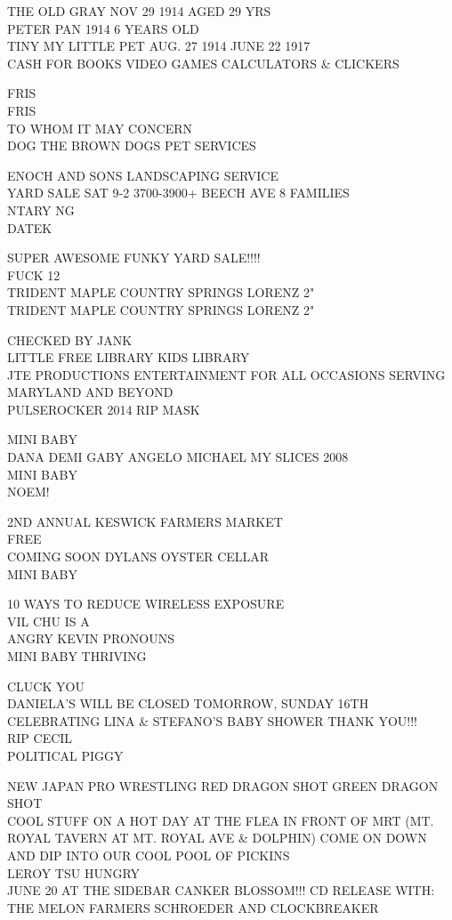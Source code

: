 \documentclass[10pt,letterpaper]{article}
\begin{document}
THE OLD GRAY NOV 29 1914 AGED 29 YRS\\
PETER PAN 1914 6 YEARS OLD\\
TINY MY LITTLE PET AUG. 27 1914 JUNE 22 1917\\
CASH FOR BOOKS VIDEO GAMES CALCULATORS \& CLICKERS

FRIS\\
FRIS\\
TO WHOM IT MAY CONCERN\\
DOG THE BROWN DOGS PET SERVICES

ENOCH AND SONS LANDSCAPING SERVICE\\
YARD SALE SAT 9{-}2 3700{-}3900+ BEECH AVE 8 FAMILIES\\
NTARY NG\\
DATEK

SUPER AWESOME FUNKY YARD SALE!!!!\\
FUCK 12\\
TRIDENT MAPLE COUNTRY SPRINGS LORENZ 2"\\
TRIDENT MAPLE COUNTRY SPRINGS LORENZ 2"

CHECKED BY JANK\\
LITTLE FREE LIBRARY KIDS LIBRARY\\
JTE PRODUCTIONS ENTERTAINMENT FOR ALL OCCASIONS SERVING MARYLAND AND BEYOND\\
PULSEROCKER 2014 RIP MASK

MINI BABY\\
DANA DEMI GABY ANGELO MICHAEL MY SLICES 2008\\
MINI BABY\\
NOEM!

2ND ANNUAL KESWICK FARMERS MARKET\\
FREE\\
COMING SOON DYLANS OYSTER CELLAR\\
MINI BABY

10 WAYS TO REDUCE WIRELESS EXPOSURE\\
VIL CHU IS A\\
ANGRY KEVIN PRONOUNS\\
MINI BABY THRIVING

CLUCK YOU\\
DANIELA'S WILL BE CLOSED TOMORROW, SUNDAY 16TH CELEBRATING LINA \& STEFANO'S BABY SHOWER THANK YOU!!!\\
RIP CECIL\\
POLITICAL PIGGY

NEW JAPAN PRO WRESTLING RED DRAGON SHOT GREEN DRAGON SHOT\\
COOL STUFF ON A HOT DAY AT THE FLEA IN FRONT OF MRT (MT. ROYAL TAVERN AT MT. ROYAL AVE \& DOLPHIN) COME ON DOWN AND DIP INTO OUR COOL POOL OF PICKINS\\
LEROY TSU HUNGRY\\
JUNE 20 AT THE SIDEBAR CANKER BLOSSOM!!! CD RELEASE WITH: THE MELON FARMERS SCHROEDER AND CLOCKBREAKER
\end{document}
